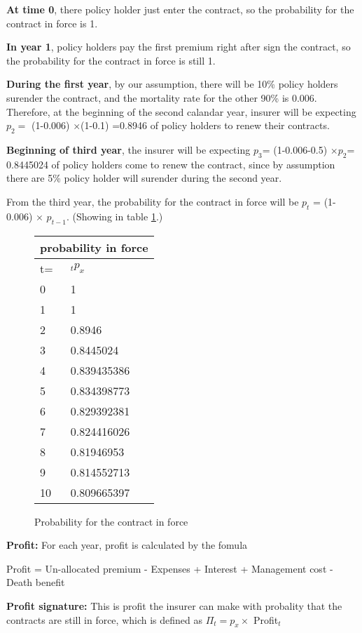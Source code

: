 \documentclass{report}
\begin{document}
\textbf{At time 0}, there policy holder just enter the contract, so the probability for the contract in force is 1.

\textbf{In year 1}, policy holders pay the first premium right after sign the contract, so the probability for the contract in force is still 1. 

\textbf{During the first year}, by our assumption, there will be 10\% policy holders surender the contract, and the mortality rate for the other 90\% is 0.006. Therefore, at the beginning of the second calandar year, insurer will be expecting $p_2=$ (1-0.006) $\times$(1-0.1) =0.8946 of policy holders to renew their contracts. 

\textbf{Beginning of third year}, the insurer will be expecting $p_3$= (1-0.006-0.5) $\times$$p_2$= 0.8445024 of policy holders come to renew the contract, since by assumption there are 5\% policy holder will surender during the second year.

From the third year, the probability for the contract in force will be $p_t$ = (1-0.006) $\times$ $p_{t-1}$. (Showing in table \ref{determ-prob-in-force}.)


\begin{figure}[H]
\begin{tabular}{|l|l|}
  \hline
  \multicolumn{2}{|c|}{probability in force} \\
  \hline
t=	& $_t p_x$\\
\hline
0	&1\\
1	&1\\
2	&0.8946\\
3	&0.8445024\\
4	&0.839435386\\
5	&0.834398773\\
6	&0.829392381\\
7	&0.824416026\\
8	&0.81946953\\
9	&0.814552713\\
10	&0.809665397\\
  \hline
\end{tabular}
\caption{Probability for the contract in force}
\label{determ-prob-in-force}
\end{figure}


\textbf{Profit:} For each year, profit is calculated by the fomula

Profit = Un-allocated premium - Expenses + Interest + Management cost - Death benefit

\textbf{Profit signature:} This is profit the insurer can make with probality that the contracts are still in force, which is defined as $\Pi_t = p_x \times$ Profit$_t$
\end{document}
